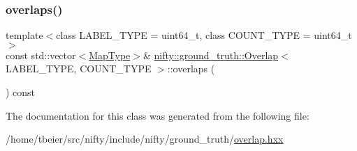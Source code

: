 \subsubsection{\texorpdfstring{overlaps()}{overlaps()}}
{\footnotesize\ttfamily template$<$class L\+A\+B\+E\+L\+\_\+\+T\+Y\+PE  = uint64\+\_\+t, class C\+O\+U\+N\+T\+\_\+\+T\+Y\+PE  = uint64\+\_\+t$>$ \\
const std\+::vector$<$\hyperlink{classnifty_1_1ground__truth_1_1Overlap_a6866ee8c988dd21d3fbd6ee5c2e836bf}{Map\+Type}$>$\& \hyperlink{classnifty_1_1ground__truth_1_1Overlap}{nifty\+::ground\+\_\+truth\+::\+Overlap}$<$ L\+A\+B\+E\+L\+\_\+\+T\+Y\+PE, C\+O\+U\+N\+T\+\_\+\+T\+Y\+PE $>$\+::overlaps (\begin{DoxyParamCaption}{ }\end{DoxyParamCaption}) const\hspace{0.3cm}{\ttfamily [inline]}}



The documentation for this class was generated from the following file\+:\begin{DoxyCompactItemize}
\item 
/home/tbeier/src/nifty/include/nifty/ground\+\_\+truth/\hyperlink{overlap_8hxx}{overlap.\+hxx}\end{DoxyCompactItemize}
